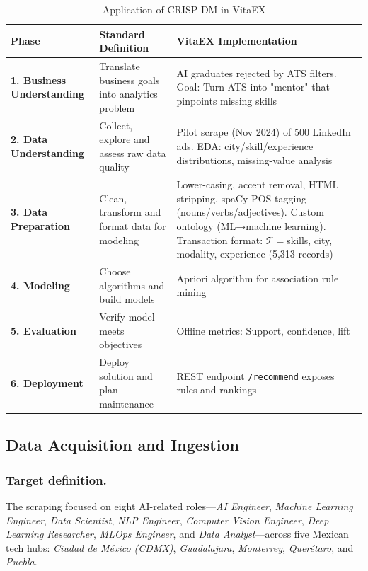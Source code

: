 \documentclass{svproc} %
\begin{document}
	
	\begin{table}[ht]
		\caption{Application of CRISP-DM in VitaEX}
		\label{tab:crispdm}
		\centering
		\small
		\begin{tabular}{p{30mm}p{35mm}p{58mm}}
			\toprule
			\textbf{Phase} & \textbf{Standard Definition} & \textbf{VitaEX Implementation} \\
			\midrule
			\textbf{1. Business Understanding} & 
			Translate business goals into analytics problem & 
			AI graduates rejected by ATS filters. Goal: Turn ATS into "mentor" that pinpoints missing skills \\
			\addlinespace
			
			\textbf{2. Data Understanding} & 
			Collect, explore and assess raw data quality & 
			Pilot scrape (Nov 2024) of 500 LinkedIn ads. EDA: city/skill/experience distributions, missing-value analysis \\
			\addlinespace
			
			\textbf{3. Data Preparation} & 
			Clean, transform and format data for modeling & 
			Lower-casing, accent removal, HTML stripping. spaCy POS-tagging (nouns/verbs/adjectives). Custom ontology (ML→machine learning). Transaction format: $\mathcal{T}=${skills, city, modality, experience} (5,313 records) \\
			\addlinespace
			
			\textbf{4. Modeling} & 
			Choose algorithms and build models & 
			Apriori algorithm for association rule mining \\
			\addlinespace
			
			\textbf{5. Evaluation} & 
			Verify model meets objectives & 
			Offline metrics: Support, confidence, lift \\
			\addlinespace
			
			\textbf{6. Deployment} & 
			Deploy solution and plan maintenance & 
			REST endpoint \texttt{/recommend} exposes rules and rankings \\
			\bottomrule
		\end{tabular}
	\end{table}
	
	\subsection{Data Acquisition and Ingestion}
	\label{ssec:data_acquisition}
	
	\subsubsection{Target definition.}
	The scraping focused on eight AI-related roles—\emph{AI Engineer}, \emph{Machine Learning Engineer}, \emph{Data Scientist}, \emph{NLP Engineer}, \emph{Computer Vision Engineer}, \emph{Deep Learning Researcher}, \emph{MLOps Engineer}, and \emph{Data Analyst}—across five Mexican tech hubs: \emph{Ciudad de México (CDMX)}, \emph{Guadalajara}, \emph{Monterrey}, \emph{Querétaro}, and \emph{Puebla}.
	
\end{document}
